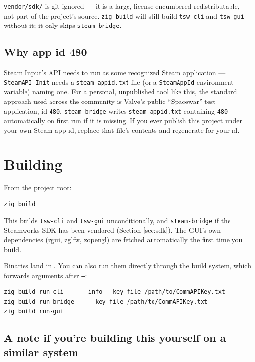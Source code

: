 \documentclass[11pt,a4paper]{article}
\newcommand{\code}[1]{\texttt{#1}}
\begin{document}
\code{vendor/sdk/} is git-ignored --- it is a large, license-encumbered
redistributable, not part of the project's source. \code{zig build} will
still build \code{tsw-cli} and \code{tsw-gui} without it; it only skips
\code{steam-bridge}.

\subsection*{Why app id 480}

Steam Input's API needs to run as some recognized Steam application ---
\code{SteamAPI\_Init} needs a \code{steam\_appid.txt} file (or a
\code{SteamAppId} environment variable) naming one. For a personal,
unpublished tool like this, the standard approach used across the
community is Valve's public ``Spacewar'' test application, id \code{480}.
\code{steam-bridge} writes \code{steam\_appid.txt} containing \code{480}
automatically on first run if it is missing. If you ever publish this
project under your own Steam app id, replace that file's contents and
regenerate  for your id.

\section{Building}

From the project root:

\begin{lstlisting}
zig build
\end{lstlisting}

This builds \code{tsw-cli} and \code{tsw-gui} unconditionally, and
\code{steam-bridge} if the Steamworks SDK has been vendored (Section
\ref{sec:sdk}). The GUI's own dependencies (zgui, zglfw, zopengl) are
fetched automatically the first time you build.

Binaries land in . You can also run them directly
through the build system, which forwards arguments after \code{--}:

\begin{lstlisting}
zig build run-cli    -- info --key-file /path/to/CommAPIKey.txt
zig build run-bridge -- --key-file /path/to/CommAPIKey.txt
zig build run-gui
\end{lstlisting}

\subsection*{A note if you're building this yourself on a similar system}
\end{document}
